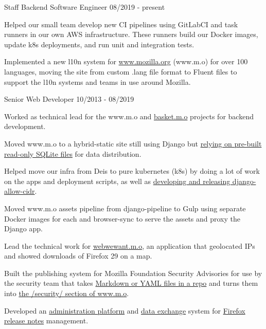 \documentclass[11pt]{article} %
\begin{document}
\begin{description}
\squish
{}
           {Staff Backend Software Engineer}
           {08/2019 - present}

Helped our small team develop new CI pipelines using GitLabCI and task runners in our own AWS infrastructure.
These runners build our Docker images, update k8s deployments, and run unit and integration tests.

Implemented a new l10n system for \href{https://github.com/mozilla/bedrock/}{www.mozilla.org} (www.m.o) for over 100 languages, moving the site from custom .lang file format to Fluent files to support
the l10n systems and teams in use around Mozilla.

           {Senior Web Developer}
           {10/2013 - 08/2019}

Worked as technical lead for the www.m.o and \href{https://github.com/mozmeao/basket/}{basket.m.o} projects for backend development.

Moved www.m.o to a hybrid-static site still using Django but
\href{https://mozilla.github.io/meao/2018/03/28/bedrock-the-sqlitening/}{relying on pre-built read-only SQLite files} for
data distribution.

Helped move our infra from Deis to pure kubernetes (k8s) by doing a lot of work on the apps and deployment scripts,
as well as \href{https://mozilla.github.io/meao/2018/02/27/django-k8s-elb-health-checks/}{developing and releasing django-allow-cidr}.

Moved www.m.o assets pipeline from django-pipeline to Gulp using separate Docker images for each and browser-sync to serve the assets
and proxy the Django app.

Lead the technical work for \href{https://blog.mozilla.org/webdev/2014/04/28/celebrating-the-web-we-want/}{webwewant.m.o},
an application that geolocated IPs and showed downloads of Firefox 29 on a map.

Built the publishing system for Mozilla Foundation Security Advisories for use by the security team that takes
\href{https://github.com/mozilla/foundation-security-advisories}{Markdown or YAML files in a repo} and turns them into
\href{https://www.mozilla.org/en-US/security/advisories/}{the /security/ section of www.m.o}.

Developed an \href{https://github.com/mozilla/nucleus/}{administration platform} and
\href{https://github.com/mozilla/release-notes/}{data exchange} system for
\href{https://www.mozilla.org/en-US/firefox/releases/}{Firefox release notes} management.


\end{description}
\end{document}
